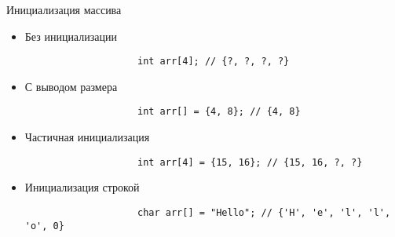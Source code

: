 \documentclass[aspectratio=169,14pt]{beamer}
\begin{document}
    \begin{frame}[fragile]{Инициализация массива}
        \begin{itemize}
            \item<1-> Без инициализации
                \begin{lstlisting}
                    int arr[4]; // {?, ?, ?, ?}
                \end{lstlisting}
            \item<2-> С выводом размера
                \begin{lstlisting}
                    int arr[] = {4, 8}; // {4, 8}
                \end{lstlisting}
            \item<3-> Частичная инициализация
                \begin{lstlisting}
                    int arr[4] = {15, 16}; // {15, 16, ?, ?}
                \end{lstlisting}
            \item<4-> Инициализация строкой
                \begin{lstlisting}
                    char arr[] = "Hello"; // {'H', 'e', 'l', 'l', 'o', 0}
                \end{lstlisting}
        \end{itemize}
    \end{frame}
\end{document}
